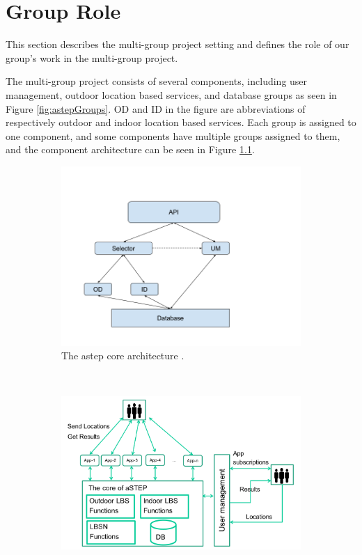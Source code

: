 \chapter{Group Role}\label{sec:grouprole}
This section describes the multi-group project setting and defines the role of our group’s work in the multi-group project.

The multi-group project consists of several components, including user management, outdoor location based services, and database groups as seen in Figure \ref{fig:astepGroups}.
OD and ID in the figure are abbreviations of respectively outdoor and indoor location based services.
Each group is assigned to one component, and some components have multiple groups assigned to them, and the component architecture can be seen in Figure \ref{fig:astepCore}.

\begin{figure}[h!]
	\centering
	\begin{subfigure}[b]{0.48\textwidth}
		\includegraphics[width=\textwidth]{figures/InformalArchitecture.png}
		\caption{The \gls{astep} core architecture \cite{astepArchitectureImage}. }
		\label{fig:astepCore}
	\end{subfigure}
	~ %
	\begin{subfigure}[b]{0.48\textwidth}
		\includegraphics[width=\textwidth]{figures/astepGroups.png}

\end{subfigure}
\end{figure}
